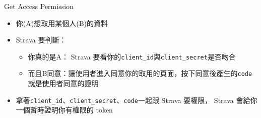 \begin{frame}{Get Access Permission}
\begin{itemize}
\item 你(A)想取用某個人(B)的資料
\item Strava 要判斷：
\begin{itemize}
\item 你真的是A： Strava 要看你的\texttt{client\_id}與\texttt{client\_secret}是否吻合
\item 而且B同意：讓使用者進入同意你的取用的頁面，按下同意後產生的\texttt{code}就是使用者同意的證明
\end{itemize}
\item 拿著\texttt{client\_id}、\texttt{client\_secret}、\texttt{code}一起跟 Strava 要權限， Strava 會給你一個暫時證明你有權限的 token\\
\end{itemize}
\end{frame}

